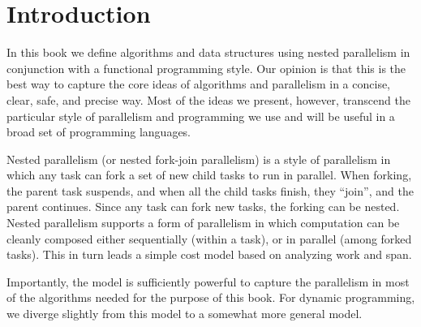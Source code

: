 \chapter{Introduction}
\label{ch:language:introduction}
 
\begin{gram} 
  In this book we define algorithms and data structures using nested
  parallelism in conjunction with a functional programming style.  Our
  opinion is that this is the best way to capture the core ideas of
  algorithms and parallelism in a concise, clear, safe, and precise way.
  Most of the ideas we present, however, transcend the particular
  style of parallelism and programming we use and will be useful in a
  broad set of programming languages.
\end{gram}

\begin{gram}
  Nested parallelism (or nested fork-join parallelism) is a style of
  parallelism in which any task can fork a set of new child tasks to
  run in parallel.  When forking, the parent task suspends, and when
  all the child tasks finish, they ``join'', and the parent continues.
  Since any task can fork new tasks, the forking can be nested.
  Nested parallelism supports a form of parallelism in which
  computation can be cleanly composed either sequentially (within a
  task), or in parallel (among forked tasks).  This in turn leads a
  simple cost model based on analyzing work and span.

%
  Importantly, the model is sufficiently powerful to capture the
  parallelism in most of the algorithms needed for the purpose of this
  book.  For dynamic programming, we diverge slightly from this model
  to a somewhat more general model.
\end{gram}

